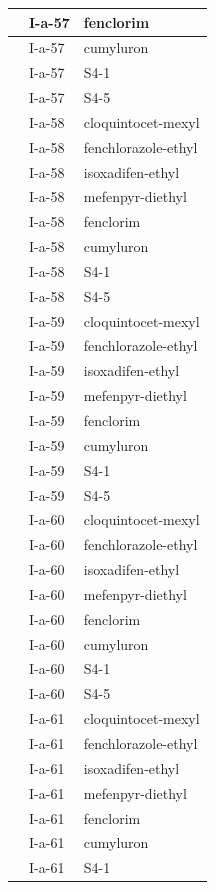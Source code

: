 \documentclass[11pt,a4paper]{article}
\begin{document}
\begin{table}[h]
\begin{tabular}{|l|l|l|}
 & I-a-57 & fenclorim \\ \hline
 & I-a-57 & cumyluron \\ \hline
 & I-a-57 & S4-1 \\ \hline
 & I-a-57 & S4-5 \\ \hline
 & I-a-58 & cloquintocet-mexyl \\ \hline
 & I-a-58 & fenchlorazole-ethyl \\ \hline
 & I-a-58 & isoxadifen-ethyl \\ \hline
 & I-a-58 & mefenpyr-diethyl \\ \hline
 & I-a-58 & fenclorim \\ \hline
 & I-a-58 & cumyluron \\ \hline
 & I-a-58 & S4-1 \\ \hline
 & I-a-58 & S4-5 \\ \hline
 & I-a-59 & cloquintocet-mexyl \\ \hline
 & I-a-59 & fenchlorazole-ethyl \\ \hline
 & I-a-59 & isoxadifen-ethyl \\ \hline
 & I-a-59 & mefenpyr-diethyl \\ \hline
 & I-a-59 & fenclorim \\ \hline
 & I-a-59 & cumyluron \\ \hline
 & I-a-59 & S4-1 \\ \hline
 & I-a-59 & S4-5 \\ \hline
 & I-a-60 & cloquintocet-mexyl \\ \hline
 & I-a-60 & fenchlorazole-ethyl \\ \hline
 & I-a-60 & isoxadifen-ethyl \\ \hline
 & I-a-60 & mefenpyr-diethyl \\ \hline
 & I-a-60 & fenclorim \\ \hline
 & I-a-60 & cumyluron \\ \hline
 & I-a-60 & S4-1 \\ \hline
 & I-a-60 & S4-5 \\ \hline
 & I-a-61 & cloquintocet-mexyl \\ \hline
 & I-a-61 & fenchlorazole-ethyl \\ \hline
 & I-a-61 & isoxadifen-ethyl \\ \hline
 & I-a-61 & mefenpyr-diethyl \\ \hline
 & I-a-61 & fenclorim \\ \hline
 & I-a-61 & cumyluron \\ \hline
 & I-a-61 & S4-1 \\ \hline

\end{tabular}
\end{table}
\end{document}
